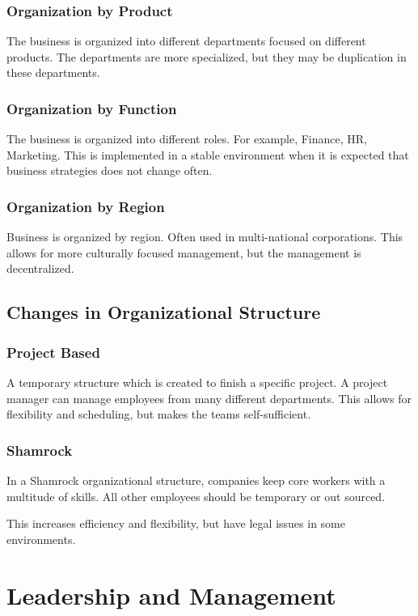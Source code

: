 \documentclass{standalone}
\begin{document}
\subsection{Organization by Product}
The business is organized into different departments focused on different products.
The departments are more specialized, but they may be duplication in these departments.

\subsection{Organization by Function}
The business is organized into different roles. 
For example, Finance, HR, Marketing.
This is implemented in a stable environment when it is expected that business strategies does not change often.

\subsection{Organization by Region}
Business is organized by region.
Often used in multi-national corporations.
This allows for more culturally focused management, but the management is decentralized.

\section{Changes in Organizational Structure}
\subsection{Project Based}
A temporary structure which is created to finish a specific project.
A project manager can manage employees from many different departments.
This allows for flexibility and scheduling, but makes the teams self-sufficient.

\subsection{Shamrock}
In a Shamrock organizational structure, companies keep core workers with a multitude of skills.
All other employees should be temporary or out sourced.

This increases efficiency and flexibility, but have legal issues in some environments.

\chapter{Leadership and Management} 
\end{document}
